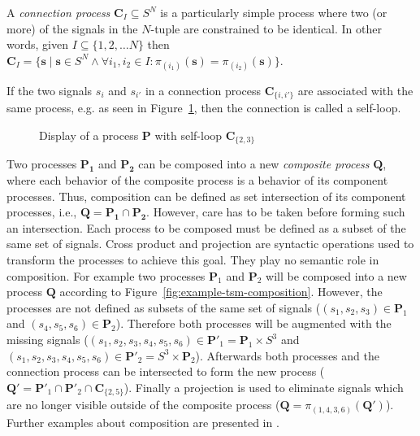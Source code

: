 \begin{sdefinition}
A \emph{connection process} $\mathbf{C}_I \subseteq S^N$ is a particularly simple
process where two (or more) of the signals in the $N$-tuple are
constrained to be identical. In other words, given $I \subseteq \{1,2,\ldots N\}$
then $\mathbf{C}_I = \{\mathbf{s} \mid \mathbf{s} \in S^N \wedge \forall{i_1, i_2 \in I}: \pi{}_{(i_1)}(\mathbf{s}) = \pi{}_{(i_2)}(\mathbf{s})\}$.
\end{sdefinition}

If the two signals $s_i$ and $s_{i'}$ in a connection process $\mathbf{C}_{\{i,i'\}}$ are
associated with the same process, e.g. as seen in Figure~\ref{fig:example-self-loop},
then the connection is called a self-loop.

\begin{figure}[htb]
\centering

\caption{\label{fig:example-self-loop}
  Display of a process $\mathbf{P}$ with self-loop $\mathbf{C}_{\{2,3\}}$}
\end{figure}

Two processes $\mathbf{P_1}$ and $\mathbf{P_2}$ can be composed into
a new \emph{composite process} $\mathbf{Q}$, where
each behavior of the composite process is a behavior of its
component processes. Thus, composition can be defined as set intersection of
its component processes, i.e., $\mathbf{Q} = \mathbf{P_1} \cap \mathbf{P_2}$.
However, care has to be taken before forming such an intersection.
Each process to be composed must be defined as a subset of the same
set of signals.
Cross product and projection are syntactic operations
used to transform the processes to achieve this goal. They play no
semantic role in composition.
For example two processes $\mathbf{P}_1$ and $\mathbf{P}_2$ will be
composed into a new process $\mathbf{Q}$ according to
Figure~\ref{fig:example-tsm-composition}. However, the processes are
not defined as subsets of the same set of signals
($(s_1,s_2,s_3) \in \mathbf{P}_1$ and $(s_4,s_5,s_6) \in \mathbf{P}_2$).
Therefore both processes will be augmented with the missing signals
($(s_1,s_2,s_3,s_4,s_5,s_6) \in \mathbf{P}'_1 = \mathbf{P}_1 \times S^3$ and
 $(s_1,s_2,s_3,s_4,s_5,s_6) \in \mathbf{P}'_2 = S^3 \times \mathbf{P}_2$).
Afterwards both processes and the connection process can be intersected to form
the new process ($\mathbf{Q}' = \mathbf{P}'_1 \cap \mathbf{P}'_2 \cap \mathbf{C}_{\{2,5\}}$).
Finally a projection is used to eliminate signals which are no longer
visible outside of the composite process ($\mathbf{Q} = \pi{}_{(1,4,3,6)}(\mathbf{Q}')$).
Further examples about composition are presented in \cite{Lee98}.

